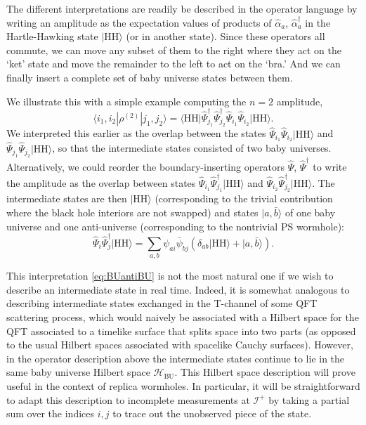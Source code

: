 \documentclass[letterpaper,12pt]{article}
\newcommand*{\hbu}{\mathcal{H}_\text{BU}} %
\newcommand*{\scri}{\mathscr{I}} %
\newcommand{\HH}{\mathrm{HH}} %
\begin{document}
The different interpretations are readily be described in the operator language by writing  an amplitude as the expectation values of products of $\hat{\alpha}_{a}$, $\hat{\alpha}_{a}^\dag$ in the Hartle-Hawking state $|\HH\rangle$ (or in another state). Since these operators all commute, we can move any subset of them to the right where they act on the `ket' state and move the remainder to the left to act on the `bra.' And we can finally insert a complete set of baby universe states between them.


We illustrate this with a simple example computing the $n=2$ amplitude,
\begin{equation}
	\langle i_1,i_2|\rho^{(2)}|j_1,j_2\rangle = \big\langle\HH\big|\hat{\Psi}_{j_1}^\dag\hat{\Psi}_{j_2}^\dag  \hat{\Psi}_{i_1}\hat{\Psi}_{i_2} \big|\HH\big\rangle.
\end{equation}
We interpreted this earlier as the overlap between the states $\hat{\Psi}_{i_1}\hat{\Psi}_{i_2} \big|\HH\big\rangle$ and $\hat{\Psi}_{j_1}\hat{\Psi}_{j_2} \big|\HH\big\rangle$, so that the intermediate states consisted of two baby universes. Alternatively, we could reorder the boundary-inserting operators $\hat \Psi$, $\hat \Psi^\dagger$ to write the amplitude as the overlap between states $\hat{\Psi}_{i_1}\hat{\Psi}^\dag_{j_1} \big|\HH\big\rangle$ and $\hat{\Psi}_{i_2}\hat{\Psi}^\dag_{j_2} \big|\HH\big\rangle$. The intermediate states are then $|\HH\rangle$ (corresponding to the trivial contribution where the black hole interiors are not swapped) and states $|a,\bar{b}\rangle$ of one baby universe and one anti-universe (corresponding to the nontrivial PS wormhole):
\begin{equation}\label{eq:BUantiBU}
	\hat{\Psi}_{i}\hat{\Psi}^\dag_{j} \big|\HH\big\rangle = \sum_{a,b}\psi_{ai}\bar{\psi}_{bj} (\delta_{ab}|\HH\rangle + |a,\bar{b}\rangle).
\end{equation}

This interpretation \eqref{eq:BUantiBU} is not the most natural one if we wish to describe an intermediate state in real time.  Indeed,  it is somewhat analogous to
describing intermediate states exchanged in the T-channel of some QFT scattering process, which would naively be associated with
a Hilbert space for the QFT associated to a timelike surface that splits space into two parts (as opposed to the usual Hilbert spaces associated with spacelike Cauchy surfaces). However, in the operator description above the intermediate states continue to lie in the same baby universe Hilbert space $\hbu$.  This Hilbert space description will prove useful in the context of replica wormholes.  In particular, it will be straightforward to adapt this description to incomplete measurements at $\scri^+$ by taking a partial sum over the indices $i,j$ to trace out the unobserved piece of the state.
\end{document}
